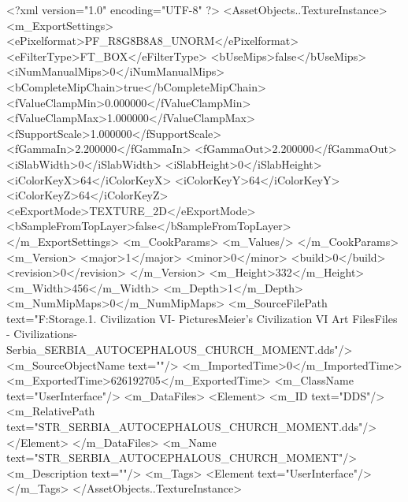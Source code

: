 <?xml version="1.0" encoding="UTF-8" ?>
<AssetObjects..TextureInstance>
	<m_ExportSettings>
		<ePixelformat>PF_R8G8B8A8_UNORM</ePixelformat>
		<eFilterType>FT_BOX</eFilterType>
		<bUseMips>false</bUseMips>
		<iNumManualMips>0</iNumManualMips>
		<bCompleteMipChain>true</bCompleteMipChain>
		<fValueClampMin>0.000000</fValueClampMin>
		<fValueClampMax>1.000000</fValueClampMax>
		<fSupportScale>1.000000</fSupportScale>
		<fGammaIn>2.200000</fGammaIn>
		<fGammaOut>2.200000</fGammaOut>
		<iSlabWidth>0</iSlabWidth>
		<iSlabHeight>0</iSlabHeight>
		<iColorKeyX>64</iColorKeyX>
		<iColorKeyY>64</iColorKeyY>
		<iColorKeyZ>64</iColorKeyZ>
		<eExportMode>TEXTURE_2D</eExportMode>
		<bSampleFromTopLayer>false</bSampleFromTopLayer>
	</m_ExportSettings>
	<m_CookParams>
		<m_Values/>
	</m_CookParams>
	<m_Version>
		<major>1</major>
		<minor>0</minor>
		<build>0</build>
		<revision>0</revision>
	</m_Version>
	<m_Height>332</m_Height>
	<m_Width>456</m_Width>
	<m_Depth>1</m_Depth>
	<m_NumMipMaps>0</m_NumMipMaps>
	<m_SourceFilePath text="F:\Mod Storage\2.1. Civilization VI\Mods\Archive - Pictures\Sid Meier's Civilization VI Art Files\Art Files - Civilizations\Civilization - Serbia\STR_SERBIA_AUTOCEPHALOUS_CHURCH_MOMENT.dds"/>
	<m_SourceObjectName text=""/>
	<m_ImportedTime>0</m_ImportedTime>
	<m_ExportedTime>626192705</m_ExportedTime>
	<m_ClassName text="UserInterface"/>
	<m_DataFiles>
		<Element>
			<m_ID text="DDS"/>
			<m_RelativePath text="STR_SERBIA_AUTOCEPHALOUS_CHURCH_MOMENT.dds"/>
		</Element>
	</m_DataFiles>
	<m_Name text="STR_SERBIA_AUTOCEPHALOUS_CHURCH_MOMENT"/>
	<m_Description text=""/>
	<m_Tags>
		<Element text="UserInterface"/>
	</m_Tags>
</AssetObjects..TextureInstance>

